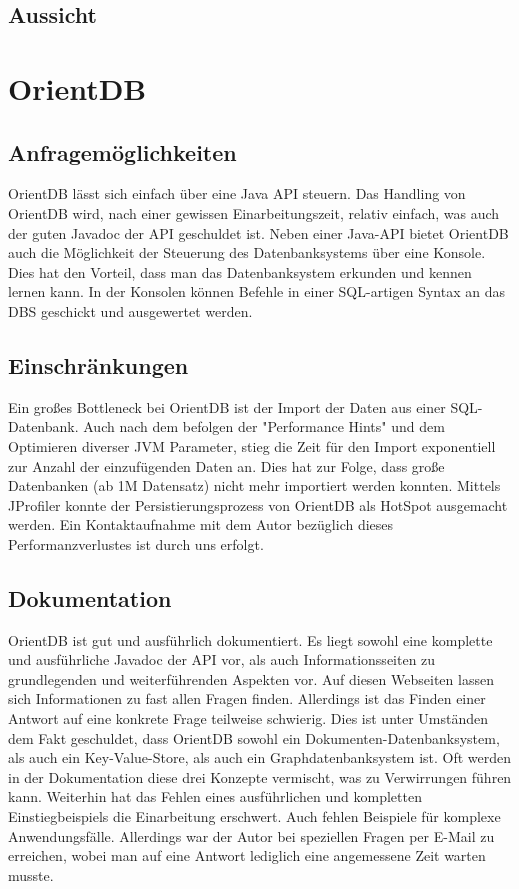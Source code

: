 \documentclass[11pt, a4paper, oneside, twocolumn]{article} %
\begin{document}
\subsection{Aussicht}

\section{OrientDB}

\subsection{Anfragemöglichkeiten}

OrientDB lässt sich einfach über eine Java API steuern. Das Handling von OrientDB wird, nach einer gewissen Einarbeitungszeit, relativ einfach, was auch der guten Javadoc der API geschuldet ist. Neben einer Java-API bietet OrientDB auch die Möglichkeit der Steuerung des Datenbanksystems über eine Konsole. Dies hat den Vorteil, dass man das Datenbanksystem erkunden und kennen lernen kann. In der Konsolen können Befehle in einer SQL-artigen Syntax an das DBS geschickt und ausgewertet werden.

\subsection{Einschränkungen}
Ein großes Bottleneck bei OrientDB ist der Import der Daten aus einer SQL-Datenbank. Auch nach dem befolgen der "Performance Hints" und dem Optimieren diverser JVM Parameter, stieg die Zeit für den Import exponentiell zur Anzahl der einzufügenden Daten an. Dies hat zur Folge, dass große Datenbanken (ab 1M Datensatz) nicht mehr importiert werden konnten. Mittels JProfiler konnte der Persistierungsprozess von OrientDB als HotSpot ausgemacht werden. Ein Kontaktaufnahme mit dem Autor bezüglich dieses Performanzverlustes ist durch uns erfolgt.

\subsection{Dokumentation}
OrientDB ist gut und ausführlich dokumentiert. Es liegt sowohl eine komplette und ausführliche Javadoc der API vor, als auch Informationsseiten zu grundlegenden und weiterführenden Aspekten vor. Auf diesen Webseiten lassen sich Informationen zu fast allen Fragen finden. Allerdings ist das Finden einer Antwort auf eine konkrete Frage teilweise schwierig. Dies ist unter Umständen dem Fakt geschuldet, dass OrientDB sowohl ein Dokumenten-Datenbanksystem, als auch ein Key-Value-Store, als auch ein Graphdatenbanksystem ist. Oft werden in der Dokumentation diese drei Konzepte vermischt, was zu Verwirrungen führen kann. Weiterhin hat das Fehlen eines ausführlichen und kompletten Einstiegbeispiels die Einarbeitung erschwert. Auch fehlen Beispiele für komplexe Anwendungsfälle. Allerdings war der Autor bei speziellen Fragen per E-Mail zu erreichen, wobei man auf eine Antwort lediglich eine angemessene Zeit warten musste.
\end{document}

